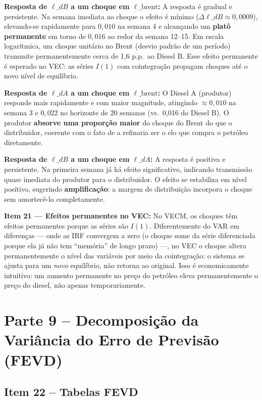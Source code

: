 \documentclass[12pt,a4paper]{article}
\begin{document}
\noindent
\textbf{Resposta de $\ell\_dB$ a um choque em $\ell\_\text{brent}$:}
A resposta é gradual e persistente.
Na semana imediata ao choque o efeito é mínimo
($\Delta\ell\_dB \approx 0{,}0009$), elevando-se rapidamente
para $0{,}010$ na semana 4 e alcançando um \textbf{platô permanente}
em torno de $0{,}016$ ao redor da semana 12--15.
Em escala logarítmica, um choque unitário no Brent (desvio padrão de um período)
transmite permanentemente cerca de 1,6 p.p.\ ao Diesel B.
Esse efeito permanente é esperado no VEC: as séries $I(1)$ com cointegração
propagam choques até o novo nível de equilíbrio.

\medskip\noindent
\textbf{Resposta de $\ell\_dA$ a um choque em $\ell\_\text{brent}$:}
O Diesel A (produtor) responde mais rapidamente e com maior magnitude,
atingindo $\approx 0{,}010$ na semana 3 e $0{,}022$ no horizonte de 20 semanas
(vs.\ 0,016 do Diesel B).
O produtor \textbf{absorve uma proporção maior} do choque do Brent
do que o distribuidor, coerente com o fato de a refinaria ser o elo
que compra o petróleo diretamente.

\medskip\noindent
\textbf{Resposta de $\ell\_dB$ a um choque em $\ell\_dA$:}
A resposta é positiva e persistente.
Na primeira semana já há efeito significativo, indicando transmissão
quase imediata do produtor para o distribuidor.
O efeito se estabiliza em nível positivo, sugerindo \textbf{amplificação}:
a margem de distribuição incorpora o choque sem amortecê-lo completamente.

\medskip\noindent
\textbf{Item 21 --- Efeitos permanentes no VEC:}
No VECM, os choques têm efeitos permanentes porque as séries são $I(1)$.
Diferentemente do VAR em diferenças --- onde as IRF convergem a zero
(o choque some da série diferenciada porque ela já não tem ``memória'' de longo prazo) ---,
no VEC o choque altera permanentemente o nível das variáveis por meio da
cointegração: o sistema se ajusta para um \emph{novo} equilíbrio, não
retorna ao original.
Isso é economicamente intuitivo: um aumento permanente no preço do petróleo
eleva permanentemente o preço do diesel, não apenas temporariamente.

\section{Parte 9 -- Decomposição da Variância do Erro de Previsão (FEVD)}

\subsection{Item 22 -- Tabelas FEVD}
\end{document}
